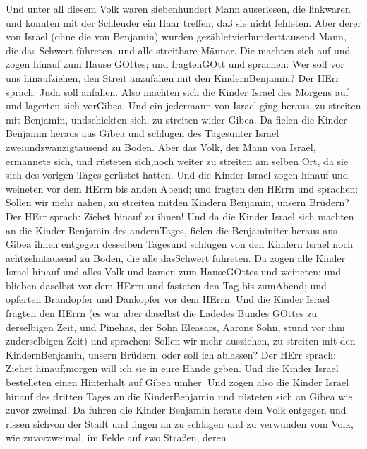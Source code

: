 Und unter all diesem Volk waren siebenhundert Mann
auserlesen, die linkwaren und konnten mit der Schleuder ein Haar
treffen, daß sie nicht fehleten.  Aber derer von Israel
(ohne die von Benjamin) wurden gezähletvierhunderttausend Mann, die das
Schwert führeten, und alle streitbare Männer.  Die machten
sich auf und zogen hinauf zum Hause GOttes; und fragtenGOtt und
sprachen: Wer soll vor uns hinaufziehen, den Streit anzufahen mit den
KindernBenjamin? Der HErr sprach: Juda soll anfahen.  Also
machten sich die Kinder Israel des Morgens auf und lagerten sich
vorGibea.  Und ein jedermann von Israel ging heraus, zu
streiten mit Benjamin, undschickten sich, zu streiten wider Gibea.
 Da fielen die Kinder Benjamin heraus aus Gibea und
schlugen des Tagesunter Israel zweiundzwanzigtausend zu Boden.
 Aber das Volk, der Mann von Israel, ermannete sich, und
rüsteten sich,noch weiter zu streiten am selben Ort, da sie sich des
vorigen Tages gerüstet hatten.  Und die Kinder Israel zogen
hinauf und weineten vor dem HErrn bis anden Abend; und fragten den HErrn
und sprachen: Sollen wir mehr nahen, zu streiten mitden Kindern
Benjamin, unsern Brüdern? Der HErr sprach: Ziehet hinauf zu ihnen!
 Und da die Kinder Israel sich machten an die Kinder
Benjamin des andernTages,  fielen die Benjaminiter heraus
aus Gibea ihnen entgegen desselben Tagesund schlugen von den Kindern
Israel noch achtzehntausend zu Boden, die alle dasSchwert führeten.
 Da zogen alle Kinder Israel hinauf und alles Volk und
kamen zum HauseGOttes und weineten; und blieben daselbst vor dem HErrn
und fasteten den Tag bis zumAbend; und opferten Brandopfer und Dankopfer
vor dem HErrn.  Und die Kinder Israel fragten den HErrn (es
war aber daselbst die Ladedes Bundes GOttes zu derselbigen Zeit,
 und Pinehas, der Sohn Eleasars, Aarons Sohn, stund vor ihm
zuderselbigen Zeit) und sprachen: Sollen wir mehr ausziehen, zu streiten
mit den KindernBenjamin, unsern Brüdern, oder soll ich ablassen? Der
HErr sprach: Ziehet hinauf;morgen will ich sie in eure Hände geben.
 Und die Kinder Israel bestelleten einen Hinterhalt auf
Gibea umher.  Und zogen also die Kinder Israel hinauf des
dritten Tages an die KinderBenjamin und rüsteten sich an Gibea wie zuvor
zweimal.  Da fuhren die Kinder Benjamin heraus dem Volk
entgegen und rissen sichvon der Stadt und fingen an zu schlagen und zu
verwunden vom Volk, wie zuvorzweimal, im Felde auf zwo Straßen, deren
